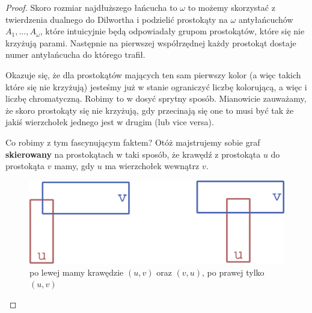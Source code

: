\begin{proof}
	Skoro rozmiar najdłuższego łańcucha to $\omega$ to możemy skorzystać z twierdzenia dualnego do Dilwortha i podzielić prostokąty na $\omega$ antyłańcuchów $A_1, ..., A_\omega$,
	które intuicyjnie będą odpowiadały grupom prostokątów, które się nie krzyżują parami.
	Następnie na pierwszej współrzędnej każdy prostokąt dostaje numer antyłańcucha do którego trafił.

	Okazuje się, że dla prostokątów mających ten sam pierwszy kolor (a więc takich które się nie krzyżują) jesteśmy już w stanie ograniczyć liczbę kolorującą, a więc i liczbę chromatyczną. Robimy to w dosyć sprytny sposób.  Mianowicie zauważamy, że skoro prostokąty się nie krzyżują, gdy przecinają się one to musi być tak że jakiś wierzchołek jednego jest w drugim (lub vice versa).

	Co robimy z tym fascynującym faktem? Otóż majstrujemy sobie graf \textbf{skierowany} na prostokątach w taki sposób,
	że krawędź z prostokąta $u$ do prostokąta $v$ mamy, gdy $u$ ma wierzchołek wewnątrz $v$.
	\begin{figure}[H]
		\centering
		\includegraphics[scale=0.75]{images/objects_on_plane/rectangle_edges.png}

		\caption{po lewej mamy krawędzie $(u, v)$ oraz $(v, u)$, po prawej tylko $(u, v)$}
	\end{figure}


\end{proof}
